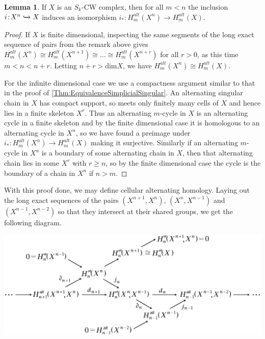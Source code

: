 \documentclass[11pt,a4paper,twoside]{article}
\theoremstyle{plain}
\theoremstyle{definition}
\theoremstyle{definition}
\newtheorem{lemma}[thm]{Lemma}
\theoremstyle{definition}
\theoremstyle{definition}
\theoremstyle{definition}
\begin{document}
\vspace{2mm}
\begin{lemma}
\label{Lem:CellChainProperties}
If $X$ is an $S_k$-CW complex, then for all $m<n$ the inclusion $i\!:\!X^n\xhookrightarrow{} X$ induces an isomorphism $i_*\!:\!H_m^{alt}(X^n)\longrightarrow H_m^{alt}(X)$.
\end{lemma}
\begin{proof}
If $X$ is finite dimensional, inspecting the same segments of the long exact sequence of pairs from the remark above gives $H^{alt}_m(X^n)\cong H^{alt}_m(X^{n+1})\cong\dots\cong H^{alt}_m(X^{n+r})$ for all $r>0$, as this time $m<n<n+r$. Letting $n+r>\text{dim}X$, we have $H^{alt}_m(X^n)\cong H^{alt}_m(X)$.

For the infinite dimensional case we use a compactness argument similar to that in the proof of \ref{Thm:EquivalenceSimplicialSingular}. An alternating singular chain in $X$ has compact support, so meets only finitely many cells of $X$ and hence lies in a finite skeleton $X^{r}$. Thus an alternating $m$-cycle in $X$ is an alternating cycle in a finite skeleton and by the finite dimensional case it is homologous to an alternating cycle in $X^n$, so we have found a preimage under $i_*\!:\!H^{alt}_m(X^n)\longrightarrow H^{alt}_m(X)$ making it surjective. Similarly if an alternating $m$-cycle in $X^n$ is a boundary of some alternating chain in $X$, then that alternating chain lies in some $X^r$ with $r\geq n$, so by the finite dimensional case the cycle is the boundary of a chain in $X^n$ if $n>m$.
\end{proof}
With this proof done, we may define cellular alternating homology.
Laying out the long exact sequences of the pairs $(X^{n+1},X^n),\,(X^n,X^{n-1})$ and $(X^{n-1},X^{n-2})$ so that they intersect at their shared groups, we get the following diagram.

\begin{center}\includegraphics[scale=0.32]{Images/CellularChainComplex.png}\end{center}
\end{document}
